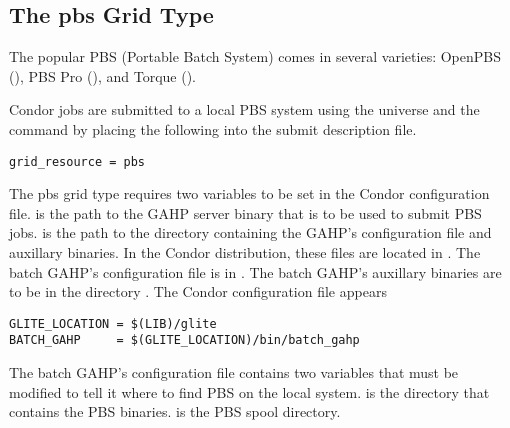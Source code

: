 
\subsection{\label{sec:PBS}The pbs Grid Type }

The popular PBS (Portable Batch System) comes in
several varieties: OpenPBS (),
PBS Pro (), and
Torque
().

Condor jobs are submitted to a local PBS system
using the  universe and the
 command by placing the following
into the submit description file.
\begin{verbatim}
grid_resource = pbs
\end{verbatim}

The pbs grid type requires two variables to be set in the Condor
configuration file.
 is the path to the GAHP server binary that is to be
used to submit PBS jobs.
 is the path to the directory containing the GAHP's
configuration file and auxillary binaries.
In the Condor distribution, these files are located in 
.
The batch GAHP's configuration file is in
.
The batch GAHP's auxillary binaries
are to be in the directory .
The Condor configuration file appears

\footnotesize
\begin{verbatim}
GLITE_LOCATION = $(LIB)/glite
BATCH_GAHP     = $(GLITE_LOCATION)/bin/batch_gahp
\end{verbatim}
\normalsize

The batch GAHP's configuration file contains two variables that must be
modified to tell it where to find PBS on the local system.
 is the directory that contains the PBS binaries.
 is the PBS spool directory.
